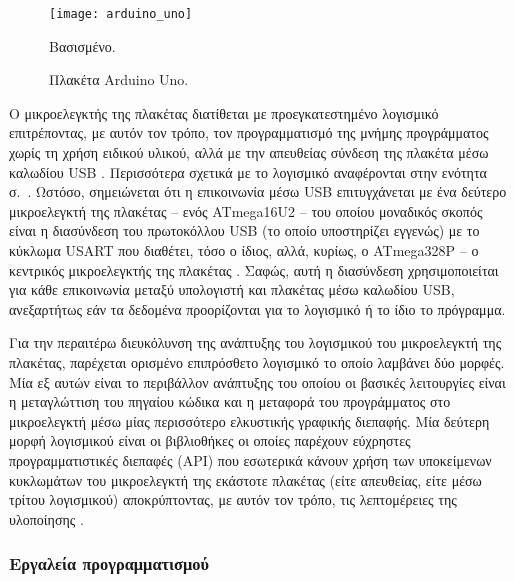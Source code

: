 \begin{figure}
    \caption{Πλακέτα Arduino Uno.\label{fig:arduino:uno-front}}
    \begin{center}
    \texttt{[image: arduino\_uno]}
    \end{center}
    Βασισμένο. 
\end{figure}

Ο μικροελεγκτής της πλακέτας  διατίθεται με
προεγκατεστημένο
λογισμικό  επιτρέποντας, με αυτόν τον τρόπο, τον προγραμματισμό
της μνήμης προγράμματος χωρίς τη χρήση ειδικού υλικού, αλλά με την απευθείας
σύνδεση της πλακέτα μέσω καλωδίου USB \parencite{arduino:environ}. Περισσότερα
σχετικά με το λογισμικό  αναφέρονται στην ενότητα
 σ.~\pageref{subsec:avr:progmem}.
Ωστόσο, σημειώνεται ότι η
επικοινωνία μέσω USB επιτυγχάνεται με ένα δεύτερο μικροελεγκτή της πλακέτας --
ενός ATmega16U2 -- του οποίου μοναδικός σκοπός είναι η διασύνδεση του
πρωτοκόλλου USB (το οποίο υποστηρίζει εγγενώς) με το κύκλωμα USART που διαθέτει,
τόσο ο ίδιος, αλλά, κυρίως, ο ATmega328P -- ο κεντρικός μικροελεγκτής της
πλακέτας \parencites{arduino:uno}[148,185]{atmel12}[172]{atmel13}. Σαφώς, αυτή η
διασύνδεση χρησιμοποιείται για κάθε επικοινωνία μεταξύ υπολογιστή και πλακέτας
μέσω καλωδίου USB, ανεξαρτήτως εάν τα δεδομένα προορίζονται για το λογισμικό
 ή το ίδιο το πρόγραμμα.

Για την περαιτέρω διευκόλυνση της ανάπτυξης του λογισμικού του μικροελεγκτή της
πλακέτας,
παρέχεται ορισμένο επιπρόσθετο λογισμικό  το οποίο λαμβάνει δύο
μορφές. Μία εξ αυτών είναι το περιβάλλον ανάπτυξης  του οποίου
οι βασικές λειτουργίες είναι η μεταγλώττιση του πηγαίου κώδικα και η μεταφορά
του προγράμματος στο μικροελεγκτή \parencite{arduino:environ} μέσω μίας
περισσότερο ελκυστικής γραφικής διεπαφής. Μία δεύτερη μορφή
λογισμικού είναι οι βιβλιοθήκες  οι οποίες παρέχουν εύχρηστες
προγραμματιστικές διεπαφές (API) που εσωτερικά κάνουν χρήση των υποκείμενων
κυκλωμάτων του μικροελεγκτή της εκάστοτε πλακέτας (είτε απευθείας, είτε μέσω
τρίτου λογισμικού) αποκρύπτοντας, με αυτόν τον τρόπο, τις λεπτομέρειες της
υλοποίησης \parencite{arduino:lib}.


\subsubsection{Εργαλεία προγραμματισμού}
\label{subsubsec:avr:toolchain}

